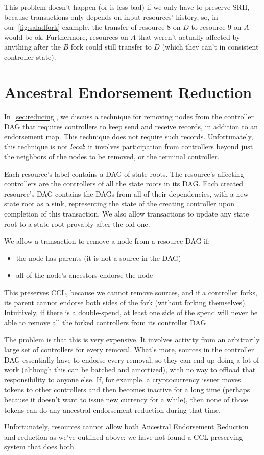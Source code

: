 \documentclass[a4paper,USenglish,cleveref, autoref, thm-restate, anonymous]{lipics-v2021}
\begin{document}
This problem doesn't happen (or is less bad) if we only have to preserve SRH, because transactions only depends on input resources' history, so, in our~\cref{fig:saladfork} example, the transfer of resource 8 on $D$ to resource 9 on $A$ would be ok.
Furthermore, resources on $A$ that weren't actually affected by anything after the $B$ fork could still transfer to $D$ (which they can't in consistent controller state). 


\section{Ancestral Endorsement Reduction}
\label{sec:ancestral}
In~\cref{sec:reducing}, we discuss a technique for removing nodes from the controller DAG that requires controllers to keep send and receive records, in addition to an endorsement map. 
This technique does not require such records.
Unfortunately, this technique is not \emph{local}: it involves participation from controllers beyond just the neighbors of the nodes to be removed, or the terminal controller.

Each resource's label contains a DAG of state roots.
The resource's affecting controllers are the controllers of all the state roots in its DAG.
Each created resource's DAG contains the DAGs from all of their dependencies, with a new state root as a sink, representing the state of the creating controller upon completion of this transaction. 
We also allow transactions to update any state root to a state root provably after the old one. 

We allow a transaction to remove a node from a resource DAG if:
\begin{itemize}
    \item the node has parents (it is not a source in the DAG)
    \item all of the node's ancestors endorse the node
\end{itemize}
This preserves CCL, because we cannot remove sources, and if a controller forks, its parent cannot endorse both sides of the fork (without forking themselves). 
Intuitively, if there is a double-spend, at least one side of the spend will never be able to remove all the forked controllers from its controller DAG. 

The problem is that this is very expensive. 
It involves activity from an arbitrarily large set of controllers for every removal. 
What's more, sources in the controller DAG essentially have to endorse every removal, so they can end up doing a lot of work (although this can be batched and amortized), with no way to offload that responsibility to anyone else. 
If, for example, a cryptocurrency issuer moves tokens to other controllers and then becomes inactive for a long time (perhaps because it doesn't want to issue new currency for a while), then none of those tokens can do any ancestral endorsement reduction during that time.

Unfortunately, resources cannot allow both Ancestral Endorsement Reduction and reduction as we've outlined above: we have not found a CCL-preserving system that does both.
\end{document}
